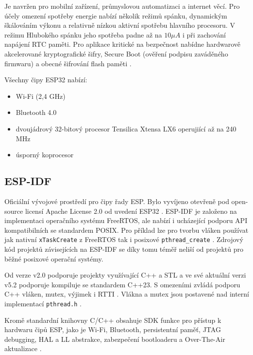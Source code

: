 Je navržen pro mobilní zařízení, průmyslovou automatizaci a internet věcí. Pro účely omezení spotřeby energie nabízí několik režimů spánku, dynamickým škálováním výkonu a relativně nízkou aktivní spotřebu hlavního procesoru. V režimu Hlubokého spánku jeho spotřeba padne až na $10 \mu A$ i při zachování napájení RTC paměti. Pro aplikace kritické na bezpečnost nabídne hardwarově akcelerované kryptografické šifry, Secure Boot (ověření podpisu zaváděného firmwaru) a obecné šifrování flash paměti \cite{esp32_datasheet}. 

Všechny čipy ESP32 nabízí\cite{espressifProductOverviewESP32}:
\begin{itemize}
    \item Wi-Fi (2,4 GHz)
    \item Bluetooth 4.0
    \item dvoujádrový 32-bitový procesor Tensilica Xtensa LX6 operujiící až na 240 MHz
    \item úsporný koprocesor
\end{itemize}

\subsection{ESP-IDF}
Oficiální vývojové prostředí pro čipy řady ESP. Bylo vyvíjeno otevřeně pod open-source licensí Apache License 2.0 od uvedení ESP32 \cite{grokhotkovInitialPublicVersion2016}. ESP-IDF je založeno na implementaci operačního systému FreeRTOS, ale nabízí i ucházející podporu API kompatibilních se standardem POSIX. Pro příklad lze pro tvorbu vláken používat jak nativní \lstinline|xTaskCreate| z FreeRTOS tak i posixové \lstinline|pthread_create| \cite{espressifPOSIXThreadsSupport}. Zdrojový kód projektů závisejících na ESP-IDF se díky tomu téměř neliší od projektů pro běžné posixové operační systémy.

Od verze v2.0 podporuje projekty využívající C++ a STL \cite{grokhotkovReleaseESPIDFRelease} a ve své aktuální verzi v5.2 podporuje kompiluje se standardem C++23. S omezeními zvládá podporu C++ vláken, mutex, výjimek i RTTI \cite{espressifSupportESP32ESPIDF}. Vlákna a mutex jsou postavené nad interní implementací \lstinline|pthread.h| \cite{espressifPOSIXThreadsSupport}.

Kromě standardní knihovny C/C++ obsahuje SDK funkce pro přístup k hardwaru čipů ESP, jako je Wi-Fi, Bluetooth, persistentní paměť, JTAG debugging, HAL a LL abstrakce, zabezpečení bootloaderu a Over-The-Air aktualizace \cite{espressifAPIGuidesESP32}.

